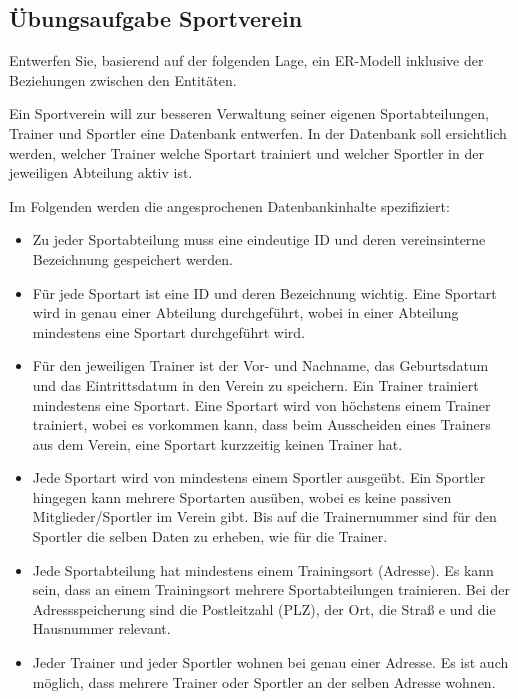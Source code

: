 \subsection{Übungsaufgabe Sportverein}
Entwerfen Sie, basierend auf der folgenden Lage, ein ER-Modell inklusive der Beziehungen zwischen
den Entit\"{a}ten.

Ein Sportverein will zur besseren Verwaltung seiner eigenen Sportabteilungen, Trainer und
Sportler eine Datenbank entwerfen. In der Datenbank soll ersichtlich werden, welcher Trainer
welche Sportart trainiert und welcher Sportler in der jeweiligen Abteilung aktiv ist.

Im Folgenden werden die angesprochenen Datenbankinhalte spezifiziert:
\begin{itemize}
    \item Zu jeder Sportabteilung muss eine eindeutige ID und deren vereinsinterne
          Bezeichnung gespeichert werden.
    \item Für jede Sportart ist eine ID und deren Bezeichnung wichtig. Eine Sportart wird in genau einer
          Abteilung durchgeführt, wobei in einer Abteilung mindestens eine Sportart durchgeführt wird.
    \item Für den jeweiligen Trainer ist der Vor- und Nachname, das Geburtsdatum
          und das Eintrittsdatum in den Verein zu speichern. Ein Trainer trainiert mindestens eine Sportart.
          Eine Sportart wird von höchstens einem Trainer trainiert, wobei es vorkommen kann, dass beim
          Ausscheiden eines Trainers aus dem Verein, eine Sportart kurzzeitig keinen Trainer hat.
    \item Jede Sportart wird von mindestens einem Sportler ausgeübt. Ein Sportler hingegen kann mehrere
          Sportarten ausüben, wobei es keine passiven Mitglieder/Sportler im Verein gibt. Bis auf die
          Trainernummer sind für den Sportler die selben Daten zu erheben, wie für die Trainer.
    \item Jede Sportabteilung hat mindestens einem Trainingsort (Adresse). Es kann sein, dass an
          einem Trainingsort mehrere Sportabteilungen trainieren. Bei der Adressspeicherung sind die
          Postleitzahl (PLZ), der Ort, die Straß e und die Hausnummer relevant.
    \item Jeder Trainer und jeder Sportler wohnen bei genau einer Adresse. Es ist auch möglich,
          dass mehrere Trainer oder Sportler an der selben Adresse wohnen.
\end{itemize}
\clearpage
